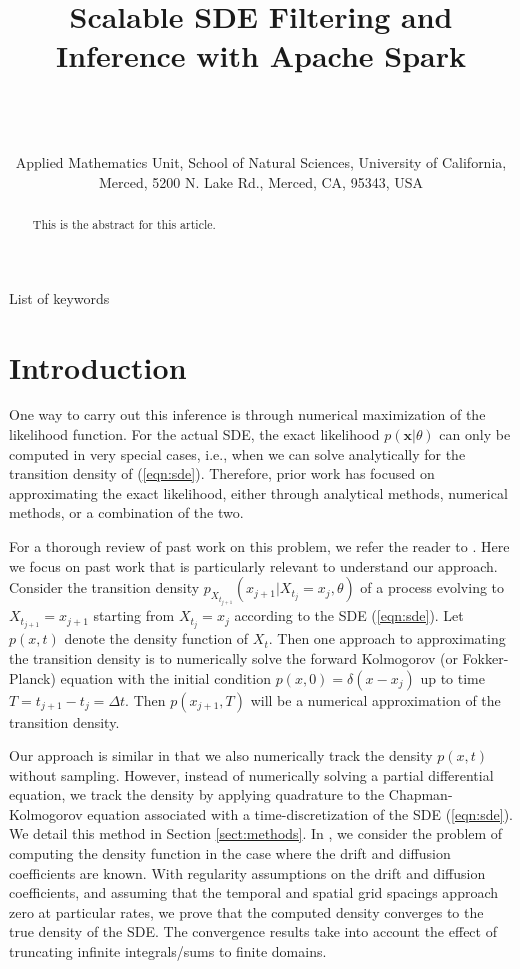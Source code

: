 \documentclass[wcp]{jmlr}
\title[Scalable SDE Filtering and Inference]{Scalable SDE Filtering and Inference with Apache Spark}
\author{\Name{Harish S. Bhat} \Email{hbhat@ucmerced.edu}\\
\Name{R. W. M. A. Madushani} \Email{rmadushani@ucmerced.edu} \\
\Name{Shagun Rawat} \Email{srawat2@ucmerced.edu} \\
\addr Applied Mathematics Unit, School of Natural Sciences, University
of California, Merced, 5200 N. Lake Rd., Merced, CA, 95343, USA}
\begin{document}
\maketitle

\begin{abstract}
This is the abstract for this article.
\end{abstract}
\begin{keywords}
List of keywords
\end{keywords}

\section{Introduction}

One way to carry out this inference is through numerical maximization of the likelihood function.  For the actual SDE, the exact likelihood $p(\mathbf{x} | \theta)$ can only be computed in very special cases, i.e., when we can solve analytically for the transition density of (\ref{eqn:sde}).  Therefore, prior work has focused on approximating the exact likelihood, either through analytical methods, numerical methods, or a combination of the two.

For a thorough review of past work on this problem, we refer the reader to \citep{sorensen2004parametric, iacus2009simulation, fuchs2013inference}.  Here we focus on past work that is particularly relevant to understand our approach.  Consider the transition density $p_{X_{t_{j+1}}}(x_{j+1} | X_{t_j} = x_j, \theta)$  of a process evolving to $X_{t_{j+1}}=x_{j+1}$ starting from $X_{t_j} = x_j$  according to the SDE (\ref{eqn:sde}). Let $p(x,t)$ denote the density function of $X_t$.  Then one approach to approximating the transition density is to numerically solve the forward Kolmogorov (or Fokker-Planck) equation with the initial condition $p(x,0) = \delta(x-x_j)$ up to time $T = t_{j+1} - t_j = \Delta t$.  Then $p(x_{j+1},T)$ will be a numerical approximation of the transition density.

Our approach is similar in that we also numerically track the density $p(x,t)$ without sampling.  However, instead of numerically solving a partial differential equation, we track the density by applying quadrature to the Chapman-Kolmogorov equation associated with a time-discretization of the SDE (\ref{eqn:sde}). We detail this method in Section \ref{sect:methods}.  In \citep{BhatMadu2016}, we consider the problem of computing the density function in the case where the drift and diffusion coefficients are known.  With regularity assumptions on the drift and diffusion coefficients, and assuming that the temporal and spatial grid spacings approach zero at particular rates, we prove that the computed density converges to the true density of the SDE.  The convergence results take into account the effect of truncating infinite integrals/sums to finite domains.
\end{document}
